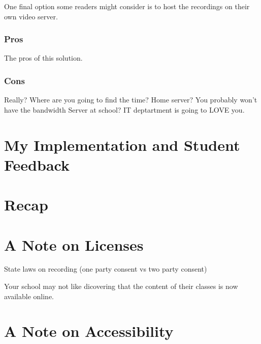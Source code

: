 \documentclass[sigconf]{acmart}
\begin{document}
One final option some readers might consider is to host the recordings on their own video server.

\subsubsection{Pros}
The pros of this solution.
\subsubsection{Cons}

Really?  Where are you going to find the time?
Home server? You probably won't have the bandwidth
Server at school?  IT deptartment is going to LOVE you.


\section{My Implementation and Student Feedback}

\section{Recap}



\section{A Note on Licenses}

State laws on recording (one party consent vs two party consent)

Your school may not like dicovering that the content of their classes is now available online.

\section{A Note on Accessibility}


\end{document}
